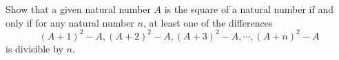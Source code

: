 Show that a given natural number $A$ is the square of a natural number if and only if for any natural number $n$, at least one of the differences
\[(A + 1)^2 - A, (A + 2)^2 - A, (A + 3)^2 - A, \cdots , (A + n)^2 - A\]
is divisible by $n$.